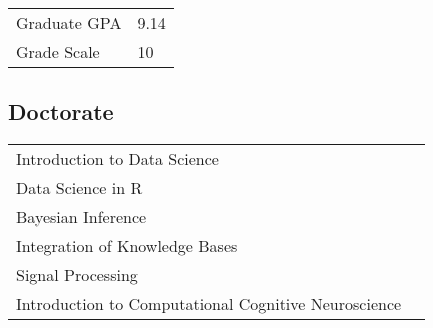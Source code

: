 \hspace{1cm}\begin{tabular}{l p{}}
Graduate GPA & 9.14 \\
Grade Scale & 10 \\
\end{tabular}

\sectionspace
\subsection{Doctorate}
\begin{minipage}{\textwidth}
\hspace{1cm}\begin{tabular}{p{} p{}}
Introduction to Data Science &  \\
Data Science in R &  \\
Bayesian Inference &  \\
Integration of Knowledge Bases &  \\
Signal Processing &  \\
Introduction to Computational Cognitive Neuroscience &  \\
\end{tabular}
\end{minipage}
